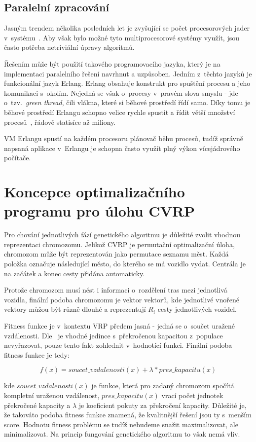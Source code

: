 \documentclass[a4paper]{article}
\begin{document}
\subsection{Paralelní zpracování}
Jasným trendem několika posledních let je zvyšující se počet procesorových jader v~systému~\cite{sekanina}. Aby však bylo možné tyto multiprocesorové systémy využít, jsou často potřeba netriviální úpravy algoritmů.

Řešením může být použití takového programovacího jazyka, který je na implementaci paralelního řešení navrhnut a uzpůsoben. Jedním z~těchto jazyků je funkcionální jazyk Erlang. Erlang obsahuje konstrukt pro spuštění procesu a jeho komunikaci s~okolím. Nejedná se však o~procesy v~pravém slova smyslu - jde o~tzv.\ \emph{green thread}, čili vlákna, které si běhové prostředí řídí samo. Díky tomu je běhové prostředí Erlangu schopno velice rychle spustit a řídit větší množství procesů~\cite{armstrong}, řádově statisíce až miliony.

VM Erlangu spustí na každém procesoru plánovač běhu procesů, tudíž správ\-ně napsaná aplikace v~Erlangu je schopna často využít plný výkon vícejádrového počítače.

\section{Koncepce optimalizačního programu pro ú\-lo\-hu CVRP}
Pro chování jednotlivých fází genetického algoritmu je důležité zvolit vhodnou reprezentaci chromozomu. Jelikož CVRP je permutační optimalizační úloha, chromozom může být reprezentován jako permutace seznamu měst. Každá po\-lož\-ka označuje ná\-sle\-du\-jící město, do kterého se má vozidlo vydat. Centrála je na začátek a konec cesty přidána automaticky.

Protože chromozom musí nést i informaci o~rozdělení tras mezi jednotlivá vozidla, finální podoba chromozomu je vektor vektorů, kde jednotlivé vnořené vektory můžou být různě dlouhé a reprezentují $R_i$ cesty jednotlivých vozidel.

Fitness funkce je v~kontextu VRP předem jasná - jedná se o~součet uražené vzdálenosti. Dle~\cite{cneo} je vhodné jedince s~překročenou kapacitou z~populace ne\-vy\-řa\-zo\-vat, pouze tento fakt zohlednit v~hodnotící funkci. Finální podoba fitness funkce je tedy:

\[f(x) = soucet\_vzdalenosti(x) + \lambda*pres\_kapacitu(x)\]

\noindent kde $soucet\_vzdalenosti(x)$ je funkce, která pro zadaný chromozom spočítá kompletní uraženou vzdálenost, $pres\_kapacitu(x)$ vrací počet jednotek překročené kapacity a $\lambda$ je koeficient pokuty za překročení kapacity. Důležité je, že takováto podoba fitness funkce znamená, že kvalitnější řešení jsou ty s~menším score. Hodnotu fitness problému se tudíž nebudeme snažit maximalizovat, ale minimalizovat. Na princip fungování genetického algoritmu to však nemá vliv.
\end{document}
